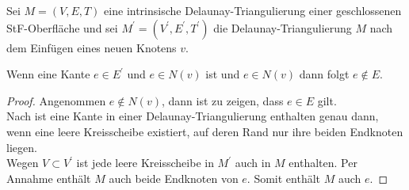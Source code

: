 \begin{lemma}
\label{le:adejazent}
Sei $M = (V,E,T)$ eine intrinsische Delaunay-Triangulierung  einer geschlossenen  StF-Oberfläche und sei $M^\prime = (V^\prime,E^\prime,T^\prime)$ die Delaunay-Triangulierung  $M$ nach dem Einfügen eines neuen Knotens $v$.
 


Wenn eine Kante $e \in E^\prime$ und $e \in N(v)$ ist und $e \in  N(v)$
dann folgt $e \not \in   E $.\\




\end{lemma}








\begin{proof}

Angenommen $e \not \in  N(v)$, dann ist zu zeigen, dass $e\in E $ gilt.\\

Nach \cite[Definition 3]{Bobenko:2007:LaplaceBeltrami} ist eine Kante in einer Delaunay-Triangulierung  enthalten genau dann, wenn eine leere Kreisscheibe existiert, auf deren Rand nur ihre beiden Endknoten liegen.\\ 

    Wegen $V \subset V^\prime$  ist jede leere Kreisscheibe in $M^\prime$  auch in  $M$ enthalten. Per Annahme enthält $M$ auch beide Endknoten von $e$. Somit enthält $M$ auch $e$.     
\end{proof}


